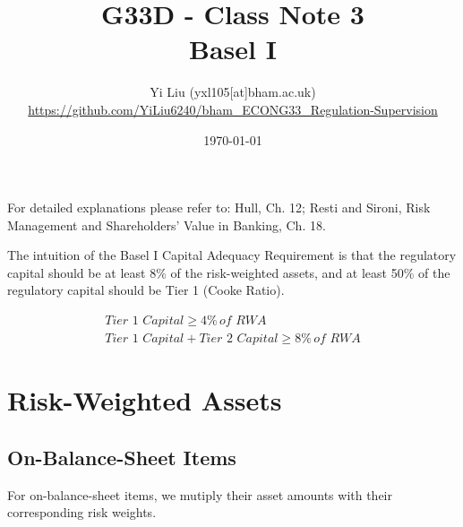 \documentclass[12pt]{article}
\author{Yi Liu (yxl105[at]bham.ac.uk)\\\scriptsize{\url{https://github.com/YiLiu6240/bham_ECONG33_Regulation-Supervision}}}
\date{\today}
\title{G33D - Class Note 3\\Basel I}
\begin{document}
\maketitle

For detailed explanations please refer to: Hull, Ch. 12; Resti and Sironi, Risk Management and Shareholders’ Value in Banking, Ch. 18.

The intuition of the Basel I Capital Adequacy Requirement is that the regulatory capital should be at least 8\% of the risk-weighted assets, and at least 50\% of the regulatory capital should be Tier 1 (Cooke Ratio).

\begin{align*}
  \textit{Tier 1 Capital} \geq 4\% \, \textit{of RWA} \\
  \textit{Tier 1 Capital} + \textit{Tier 2 Capital} \geq 8\% \, \textit{of RWA}
\end{align*}

\tableofcontents

\section{Risk-Weighted Assets}

\subsection{On-Balance-Sheet Items}

For on-balance-sheet items, we mutiply their asset amounts with their corresponding risk weights.
\end{document}
